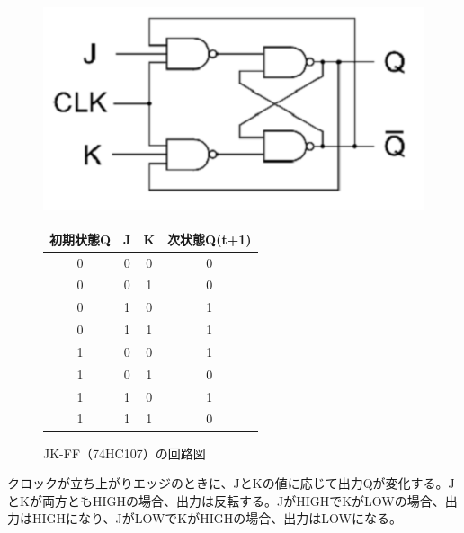 \documentclass{jlreq}
\numberwithin{equation}{section}
\begin{document}
\begin{figure}[H]
  \centering
  \begin{minipage}{0.45\textwidth}
    \centering
    \includegraphics[width=1.2\textwidth]{assets/jk-ff.png}
    \caption{JK-FF（74HC107）の回路図}
  \end{minipage}
  \hfill
  \begin{minipage}{0.45\textwidth}
    \centering
      \label{tab:jk_ff_truth_table}
      \begin{tabular}{|c|c|c|c|}
        \hline
        初期状態Q & J & K & 次状態Q(t+1) \\ \hline
        0 & 0 & 0 & 0 \\ \hline
        0 & 0 & 1 & 0 \\ \hline
        0 & 1 & 0 & 1 \\ \hline
        0 & 1 & 1 & 1 \\ \hline
        1 & 0 & 0 & 1 \\ \hline
        1 & 0 & 1 & 0 \\ \hline
        1 & 1 & 0 & 1 \\ \hline
        1 & 1 & 1 & 0 \\ \hline
      \end{tabular}
  \end{minipage}
\end{figure}

クロックが立ち上がりエッジのときに、JとKの値に応じて出力Qが変化する。JとKが両方ともHIGHの場合、出力は反転する。JがHIGHでKがLOWの場合、出力はHIGHになり、JがLOWでKがHIGHの場合、出力はLOWになる。
\end{document}
